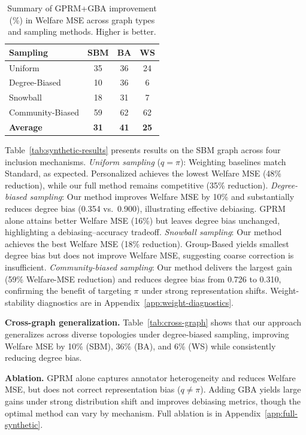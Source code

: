 \documentclass{article}
\theoremstyle{plain}
\theoremstyle{definition}
\theoremstyle{remark}
\begin{document}
\begin{table}[ht]
\caption{Summary of GPRM+GBA improvement (\%) in Welfare MSE across graph types and sampling methods. Higher is better.}
\label{tab:improvement-summary}
\centering
\small
\begin{tabular}{lccc}
\toprule
\textbf{Sampling} & \textbf{SBM} & \textbf{BA} & \textbf{WS} \\
\midrule
Uniform & 35 & 36 & 24 \\
Degree-Biased & 10 & 36 & 6 \\
Snowball & 18 & 31 & 7 \\
Community-Biased & 59 & 62 & 62 \\
\midrule
\textbf{Average} & \textbf{31} & \textbf{41} & \textbf{25} \\
\bottomrule
\end{tabular}
\end{table}
Table~\ref{tab:synthetic-results} presents results on the SBM graph across four inclusion mechanisms. \textit{Uniform sampling} ($q=\pi$): Weighting baselines match Standard, as expected. Personalized achieves the lowest Welfare MSE (48\% reduction), while our full method remains competitive (35\% reduction).
\textit{Degree-biased sampling}: Our method improves Welfare MSE by 10\% and substantially reduces degree bias (0.354 vs.\ 0.900), illustrating effective debiasing. GPRM alone attains better Welfare MSE (16\%) but leaves degree bias unchanged, highlighting a debiasing--accuracy tradeoff.
\textit{Snowball sampling}: Our method achieves the best Welfare MSE (18\% reduction). Group-Based yields smallest degree bias but does not improve Welfare MSE, suggesting coarse correction is insufficient.
\textit{Community-biased sampling}: Our method delivers the largest gain (59\% Welfare-MSE reduction) and reduces degree bias from 0.726 to 0.310, confirming the benefit of targeting $\pi$ under strong representation shifts.
Weight-stability diagnostics are in Appendix~\ref{app:weight-diagnostics}.

\textbf{Cross-graph generalization.} Table~\ref{tab:cross-graph} shows that our approach generalizes across diverse topologies under degree-biased sampling, improving Welfare MSE by 10\% (SBM), 36\% (BA), and 6\% (WS) while consistently reducing degree bias.

\textbf{Ablation.}
GPRM alone captures annotator heterogeneity and reduces Welfare MSE, but does not correct representation bias ($q\neq\pi$). Adding GBA yields large gains under strong distribution shift and improves debiasing metrics, though the optimal method can vary by mechanism. Full ablation is in Appendix~\ref{app:full-synthetic}.
\end{document}
